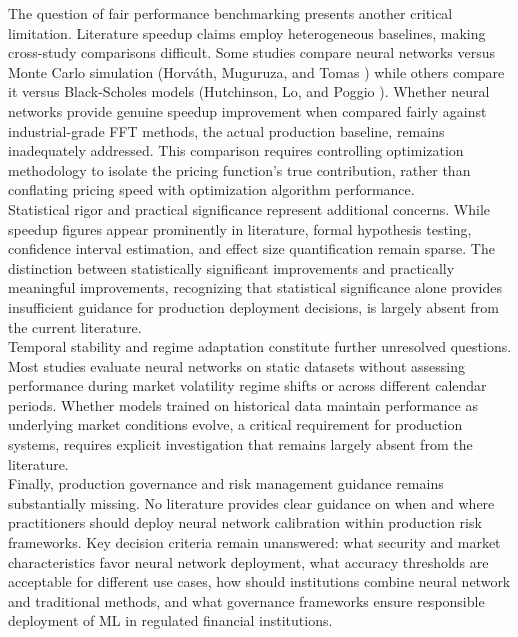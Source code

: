 \documentclass[12pt,a4paper]{article}
\begin{document}
The question of fair performance benchmarking presents another critical limitation. Literature speedup claims employ heterogeneous baselines, making cross-study comparisons difficult. Some studies compare neural networks versus Monte Carlo simulation (Horváth, Muguruza, and Tomas \cite{HorvathMuguruzaTomas2019}) while others compare it versus Black-Scholes models (Hutchinson, Lo, and Poggio \cite{HutchinsonLoPogg1994}). Whether neural networks provide genuine speedup improvement when compared fairly against industrial-grade FFT methods, the actual production baseline, remains inadequately addressed. This comparison requires controlling optimization methodology to isolate the pricing function's true contribution, rather than conflating pricing speed with optimization algorithm performance.\\[0.05cm]

Statistical rigor and practical significance represent additional concerns. While speedup figures appear prominently in literature, formal hypothesis testing, confidence interval estimation, and effect size quantification remain sparse. The distinction between statistically significant improvements and practically meaningful improvements, recognizing that statistical significance alone provides insufficient guidance for production deployment decisions, is largely absent from the current literature.\\[0.3cm]

Temporal stability and regime adaptation constitute further unresolved questions. Most studies evaluate neural networks on static datasets without assessing performance during market volatility regime shifts or across different calendar periods. Whether models trained on historical data maintain performance as underlying market conditions evolve, a critical requirement for production systems, requires explicit investigation that remains largely absent from the literature.\\[0.05cm]

Finally, production governance and risk management guidance remains substantially missing. No literature provides clear guidance on when and where practitioners should deploy neural network calibration within production risk frameworks. Key decision criteria remain unanswered: what security and market characteristics favor neural network deployment, what accuracy thresholds are acceptable for different use cases, how should institutions combine neural network and traditional methods, and what governance frameworks ensure responsible deployment of ML in regulated financial institutions.\\[0.05cm]
\end{document}
